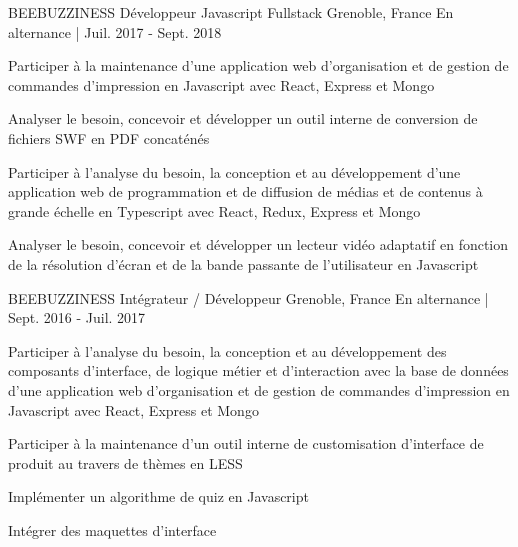 

\begin{cventries}

  \cventry
  	{BEEBUZZINESS} %
    {Développeur Javascript Fullstack} %
    {Grenoble, France} %
    {En alternance | Juil. 2017 - Sept. 2018} %
    {
      \begin{cvitems} %
        \item {Participer à la maintenance d’une application web d'organisation et de gestion de commandes d'impression en Javascript avec React, Express et Mongo}
        \item {Analyser le besoin, concevoir et développer un outil interne de conversion de fichiers SWF en PDF concaténés}
        \item {Participer à l’analyse du besoin, la conception et au développement d’une application web de programmation et de diffusion de médias et de contenus à grande échelle en Typescript avec React, Redux, Express et Mongo}
        \item {Analyser le besoin, concevoir et développer un lecteur vidéo adaptatif en fonction de la résolution d'écran et de la bande passante de l'utilisateur en Javascript}
      \end{cvitems}
    }

  \cventry
  	{BEEBUZZINESS} %
    {Intégrateur / Développeur} %
    {Grenoble, France} %
    {En alternance | Sept. 2016 - Juil. 2017} %
    {
      \begin{cvitems} %
        \item {Participer à l’analyse du besoin, la conception et au développement des composants d’interface, de logique métier et d’interaction avec la base de données d'une application web d'organisation et de gestion de commandes d'impression en Javascript avec React, Express et Mongo}
        \item {Participer à la maintenance d’un outil interne de customisation d’interface de produit au travers de thèmes en LESS}
        \item {Implémenter un algorithme de quiz en Javascript}
        \item {Intégrer des maquettes d’interface}
      \end{cvitems}
    }

\end{cventries}
